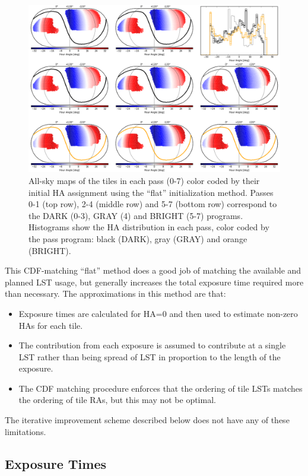 \documentclass[12pt]{article}
\begin{document}
\begin{figure}[htb]
\begin{center}
\includegraphics[width=6in]{HA_flat0}
\caption{All-sky maps of the tiles in each pass (0-7) color coded by their initial HA assignment using the ``flat'' initialization method.  Passes 0-1 (top row), 2-4 (middle row) and 5-7 (bottom row) correspond to the DARK (0-3), GRAY (4) and BRIGHT (5-7) programs.  Histograms show the HA distribution in each pass, color coded by the pass program: black (DARK), gray (GRAY) and orange (BRIGHT).}
\label{fig:HA_flat0}
\end{center}
\end{figure}

This CDF-matching ``flat'' method does a good job of matching the available and planned LST usage, but generally increases the total exposure time required more than necessary. The approximations in this method are that:
\begin{itemize}
    \item Exposure times are calculated for HA=0 and then used to estimate non-zero HAs for each tile.
    \item The contribution from each exposure is assumed to contribute at a single LST rather than being spread of LST in proportion to the length of the exposure.
    \item The CDF matching procedure enforces that the ordering of tile LSTs matches the ordering of tile RAs, but this may not be optimal.
\end{itemize}
The iterative improvement scheme described below does not have any of these limitations.

\subsection{Exposure Times}
\end{document}
